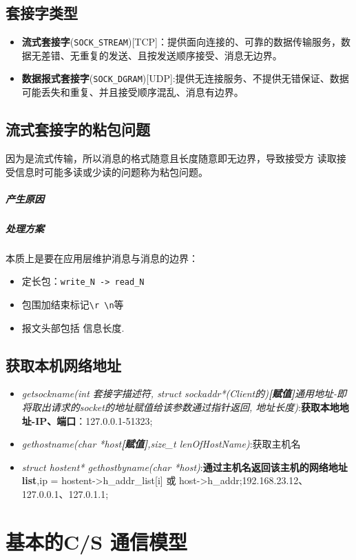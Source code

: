 \documentclass[UTF8,a4paper,12pt]{ctexbook}
\begin{document}
		\subsection{套接字类型}
			\begin{itemize}
				\item \textbf{流式套接字}(\verb|SOCK_STREAM|)[TCP]：提供面向连接的、可靠的数据传输服务，数据无差错、无重复的发送、且按发送顺序接受、消息无边界。
				\item \textbf{数据报式套接字}(\verb|SOCK_DGRAM|)[UDP]:提供无连接服务、不提供无错保证、数据可能丢失和重复、并且接受顺序混乱、消息有边界。
			\end{itemize}	
			
		\subsection{流式套接字的粘包问题}
			因为是流式传输，所以消息的格式随意且长度随意即无边界，导致接受方 读取接受信息时可能多读或少读的问题称为粘包问题。
			\subparagraph{产生原因}
				
			\subparagraph{处理方案}
				本质上是要在应用层维护消息与消息的边界：
				
				\begin{itemize}
					\item 定长包：\verb|write_N -> read_N|
					\item 包围加结束标记\verb|\r \n|等
					\item 报文头部包括 信息长度.
				\end{itemize}
		
		\subsection{获取本机网络地址}
			\begin{itemize}
				\item \textit{getsockname(int 套接字描述符, struct sockaddr*(Client的)\textbf{[赋值]}通用地址-即将取出请求的socket的地址赋值给该参数通过指针返回, 地址长度)}:\textbf{获取本地地址-IP、端口}：127.0.0.1-51323;
				\item \textit{gethostname(char *host\textbf{[赋值]},size\_t lenOfHostName)}:获取主机名
				\item \textit{struct hostent* gethostbyname(char *host)}:\textbf{通过主机名返回该主机的网络地址list},ip = hostent->h\_addr\_list[i] 或 host->h\_addr;192.168.23.12、127.0.0.1、127.0.1.1;
			\end{itemize}
			
	\section{基本的C/S 通信模型}
\end{document}
